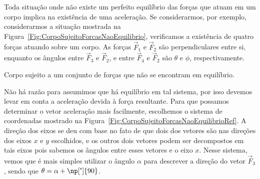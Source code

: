 Toda situação onde não existe um perfeito equilíbrio das forças que atuam em um corpo implica na existência de uma aceleração. Se considerarmos, por exemplo, considerarmos a situação mostrada na Figura~\ref{Fig:CorpoSujeitoForcasNaoEquilibrio}, verificamos a existência de quatro forças atuando sobre um corpo. As forças $\vec{F}_1$ e $\vec{F}_2$ são perpendiculares entre si, enquanto os ângulos entre $\vec{F}_3$ e $\vec{F}_2$, e entre $\vec{F}_4$ e $\vec{F}_2$ são $\theta$ e $\phi$, respectivamente. 

\begin{marginfigure}
\centering
{}
\caption{Corpo sujeito a um conjunto de forças que não se encontram em equilíbrio.\label{Fig:CorpoSujeitoForcasNaoEquilibrio}}
\end{marginfigure}

Não há razão para assumimos que há equilíbrio em tal sistema, por isso devemos levar em conta a aceleração devida à força resultante. Para que possamos determinar o vetor aceleração mais facilmente, escolhemos o sistema de coordenadas mostrado na Figura~\ref{Fig:CorpoSujeitoForcasNaoEquilibrioRef}. A direção dos eixos se deu com base no fato de que dois dos vetores são nas direções dos eixos $x$ e $y$ escolhidos, e os outros dois vetores podem ser decompostos em tais eixos pois sabemos os ângulos entre esses vetores e o eixo $x$. Nesse sistema, vemos que é mais simples utilizar o ângulo $\alpha$ para descrever a direção do vetor $\vec{F}_3$, sendo que $\theta = \alpha + \np[\tcdegree]{90}$.

